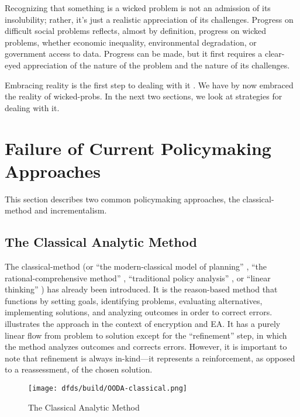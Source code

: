 \begin{displayquote}
Recognizing that something is a wicked problem is not an admission of its insolubility; rather, it’s just a realistic
appreciation of its challenges. Progress on difficult social problems reflects, almost by definition, progress on wicked
problems, whether economic inequality, environmental degradation, or government access to data. Progress can be made,
but it first requires a clear-eyed appreciation of the nature of the problem and the nature of its challenges.
\cite{rozenshtein_wicked_2018}
\end{displayquote}

Embracing reality is the first step to dealing with it \cite{baker_2019}. We have by now embraced the reality of
\acp{wicked-prob}. In the next two sections, we look at strategies for dealing with it.


\section{Failure of Current Policymaking Approaches}

This section describes two common policymaking approaches, the \ac{classical-method} and \ac{incrementalism}.

\subsection{The Classical Analytic Method}

The \ac{classical-method} \cite{feeley_judicial_2000} (or ``the modern-classical model of planning''
\cite{rittel_dilemmas_1973}, ``the rational-comprehensive method'' \cite{lindblom_muddling_1959}, ``traditional policy
analysis'' \cite{rozenshtein_wicked_2018}, or ``linear thinking'' \cite{commission_tackling_2018}) has already been
introduced. It is the reason-based method that functions by setting goals, identifying problems, evaluating
alternatives, implementing solutions, and analyzing outcomes in order to correct errors. 
illustrates the approach in the context of encryption and \ac{EA}. It has a purely linear flow from problem to solution
except for the ``refinement'' step, in which the method analyzes outcomes and corrects errors. However, it is important
to note that refinement is always in-kind---it represents a reinforcement, as opposed to a reassessment, of the chosen
solution.

\begin{figure}[h]
  \centering\CaptionFontSize
  \texttt{[image: dfds/build/OODA-classical.png]}
  \caption[The Classical Analytic Method]{The Classical Analytic Method}
  \label{fig-classical-method}
\end{figure}

